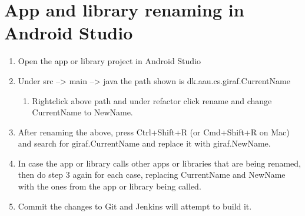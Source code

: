 \chapter{App and library renaming in Android Studio}
\begin{enumerate}
	\item Open the app or library project in Android Studio
	\item Under src --> main --> java the path shown is dk.aau.cs.giraf.CurrentName
	\begin{enumerate}
		\item Rightclick above path and under refactor click rename and change CurrentName to NewName.
	\end{enumerate}
	\item After renaming the above, press Ctrl+Shift+R (or Cmd+Shift+R on Mac) and search for giraf.CurrentName and replace it with giraf.NewName.
	\item In case the app or library calls other apps or libraries that are being renamed, then do step 3 again for each case, replacing CurrentName and NewName with the ones from the app or library being called.
	\item Commit the changes to Git and Jenkins will attempt to build it.
\end{enumerate}